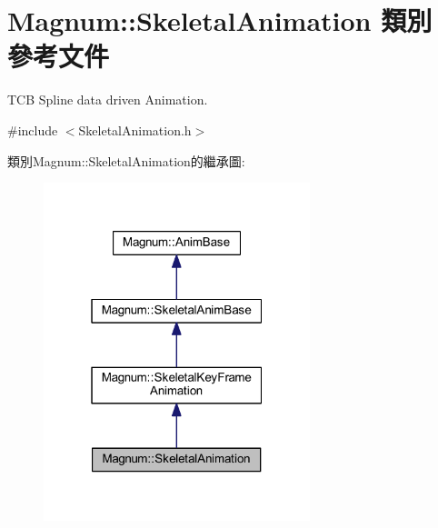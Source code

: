 \hypertarget{class_magnum_1_1_skeletal_animation}{}\section{Magnum\+:\+:Skeletal\+Animation 類別 參考文件}
\label{class_magnum_1_1_skeletal_animation}


T\+CB Spline data driven Animation.  




{\ttfamily \#include $<$Skeletal\+Animation.\+h$>$}



類別\+Magnum\+:\+:Skeletal\+Animation的繼承圖\+:\nopagebreak
\begin{figure}[H]
\begin{center}
\leavevmode
\includegraphics[width=220pt]{class_magnum_1_1_skeletal_animation__inherit__graph}
\end{center}
\end{figure}


